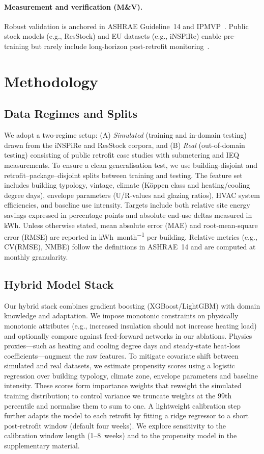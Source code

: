 ﻿\documentclass{article}
\begin{document}
\paragraph{Measurement and verification (M\&V).} Robust validation is anchored in ASHRAE Guideline~14 and IPMVP~\citep{ashrae2014guideline,ipmvp2012}. Public stock models (e.g., ResStock) and EU datasets (e.g., iNSPiRe) enable pre-training but rarely include long-horizon post-retrofit monitoring~\citep{resstock2017,wolf2014inspire}.

\section{Methodology}
\subsection{Data Regimes and Splits}
We adopt a two-regime setup: (A) \emph{Simulated} (training and in-domain testing) drawn from the iNSPiRe and ResStock corpora, and (B) \emph{Real} (out-of-domain testing) consisting of public retrofit case studies with submetering and IEQ measurements. To ensure a clean generalisation test, we use building-disjoint and retrofit–package–disjoint splits between training and testing. The feature set includes building typology, vintage, climate (K\"oppen class and heating/cooling degree days), envelope parameters (U/R-values and glazing ratios), HVAC system efficiencies, and baseline use intensity. Targets include both relative site energy savings expressed in percentage points and absolute end‑use deltas measured in \si{kWh}. Unless otherwise stated, mean absolute error (MAE) and root‑mean‑square error (RMSE) are reported in \si{kWh\per month} per building. Relative metrics (e.g., CV(RMSE), NMBE) follow the definitions in ASHRAE~14 and are computed at monthly granularity.
\subsection{Hybrid Model Stack}
Our hybrid stack combines gradient boosting (XGBoost/LightGBM) with domain knowledge and adaptation. We impose monotonic constraints on physically monotonic attributes (e.g., increased insulation should not increase heating load) and optionally compare against feed‑forward networks in our ablations. Physics proxies—such as heating and cooling degree days and steady‑state heat‑loss coefficients—augment the raw features. To mitigate covariate shift between simulated and real datasets, we estimate propensity scores using a logistic regression over building typology, climate zone, envelope parameters and baseline intensity. These scores form importance weights that reweight the simulated training distribution; to control variance we truncate weights at the 99th percentile and normalise them to sum to one. A lightweight calibration step further adapts the model to each retrofit by fitting a ridge regressor to a short post‑retrofit window (default four weeks). We explore sensitivity to the calibration window length (1–8~weeks) and to the propensity model in the supplementary material.
\end{document}
